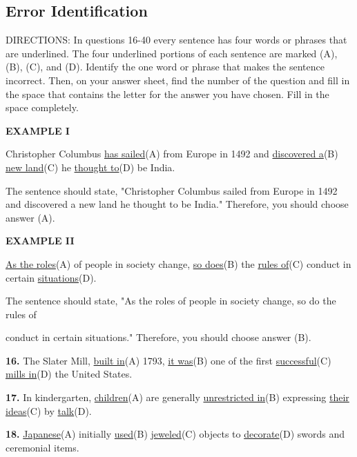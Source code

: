 \documentclass[12pt]{article}
\begin{document}
\subsection*{Error Identification}
DIRECTIONS: In questions 16-40 every sentence has four words or phrases that are underlined. The four underlined portions of each sentence are marked (A), (B), (C), and (D). Identify the one word or phrase that makes the sentence incorrect. Then, on your answer sheet, find the number of the question and fill in the space that contains the letter for the answer you have chosen. Fill in the space completely.\par
\begin{exampleblock}
\textbf{EXAMPLE I}\par
Christopher Columbus \uline{has sailed}(A) from Europe in 1492 and \uline{discovered a}(B) \uline{new land}(C) he \uline{thought to}(D) be India.\par
The sentence should state, "Christopher Columbus sailed from Europe in 1492 and discovered a new land he thought to be India." Therefore, you should choose answer (A).\par
\end{exampleblock}
\begin{exampleblock}
\textbf{EXAMPLE II}\par
\uline{As the roles}(A) of people in society change, \uline{so does}(B) the \uline{rules of}(C) conduct in certain \uline{situations}(D).\par
The sentence should state, "As the roles of people in society change, so do the rules of\par
conduct in certain situations." Therefore, you should choose answer (B).\par
\end{exampleblock}
\noindent\textbf{16.} The Slater Mill, \uline{built in}(A) 1793, \uline{it was}(B) one of the first \uline{successful}(C) \uline{mills in}(D) the United States.
\par
\vspace{\questionblockgap}
\noindent\textbf{17.} In kindergarten, \uline{children}(A) are generally \uline{unrestricted in}(B) expressing \uline{their ideas}(C) by \uline{talk}(D).
\par
\vspace{\questionblockgap}
\noindent\textbf{18.} \uline{Japanese}(A) initially \uline{used}(B) \uline{jeweled}(C) objects to \uline{decorate}(D) swords and ceremonial items.
\par
\vspace{\questionblockgap}
\end{document}
